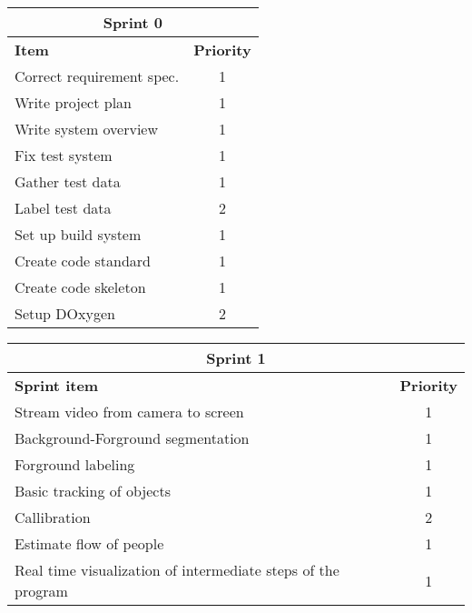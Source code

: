 \label{sprint0}
\begin{center}
	\begin{Large}
	\begin{tabular}{|p{10.5cm}|c|}
		\hline
		\multicolumn{2}{|c|}{\textbf{Sprint 0}} \\
		\hline
		\large{\textbf{Item}} & \large{\textbf{Priority}} \\
		\hline
		\large{Correct requirement spec.} & \large{1} \\
		\hline
		\large{Write project plan} & \large{1} \\
		\hline
		\large{Write system overview} & \large{1} \\
		\hline
		\large{Fix test system} & \large{1} \\
		\hline
		\large{Gather test data} & \large{1} \\
		\hline
		\large{Label test data} & \large{2} \\
		\hline
		\large{Set up build system} & \large{1} \\
		\hline	
		\large{Create code standard} & \large{1} \\
		\hline	
		\large{Create code skeleton} & \large{1} \\
		\hline	
		\large{Setup DOxygen} & \large{2} \\
		\hline		
	\end{tabular}
	\end{Large}
\end{center}



\label{sprint1}
\begin{center}
	\begin{Large}
	\begin{tabular}{|p{10.5cm}|c|}
		\hline
		\multicolumn{2}{|c|}{\textbf{Sprint 1}} \\
		\hline
		\large{\textbf{Sprint item}} & \large{\textbf{Priority}} \\
		\hline
		\large{Stream video from camera to screen} & \large{1} \\
		\hline
		\large{Background-Forground segmentation} & \large{1} \\
		\hline
		\large{Forground labeling} & \large{1} \\
		\hline
		\large{Basic tracking of objects} & \large{1} \\
		\hline
		\large{Callibration} & \large{2} \\
		\hline
		\large{Estimate flow of people} & \large{1} \\
		\hline
		\large{Real time visualization of intermediate steps of the program} & \large{1} \\
		\hline
	\end{tabular}
	\end{Large}
\end{center}



